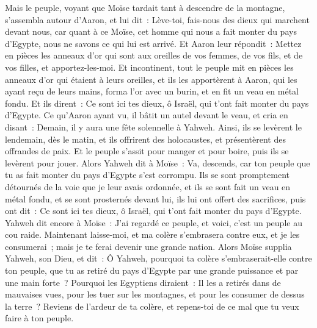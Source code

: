 \begin{multicols}{2}
\VerseOne{}Mais le peuple, voyant que Moïse tardait tant à descendre de la montagne, s'assembla autour d'Aaron, et lui dit~: Lève-toi, fais-nous des dieux qui marchent devant nous, car quant à ce Moïse, cet homme qui nous a fait monter du pays d'Egypte, nous ne savons ce qui lui est arrivé.
Et Aaron leur répondit~: Mettez en pièces les anneaux d'or qui sont aux oreilles de vos femmes, de vos fils, et de vos filles, et apportez-les-moi.
 Et incontinent, tout le peuple mit en pièces les anneaux d'or qui étaient à leurs oreilles, et ils les apportèrent à Aaron, 
qui les ayant reçu de leurs mains, forma l'or avec un burin, et en fit un veau en métal fondu. Et ils dirent~: Ce sont ici tes dieux, ô Israël, qui t'ont fait monter du pays d'Egypte.
Ce qu'Aaron ayant vu, il bâtit un autel devant le veau, et cria en disant~: Demain, il y aura une fête solennelle à Yahweh.
Ainsi, ils se levèrent le lendemain, dès le matin, et ils offrirent des holocaustes, et présentèrent des offrandes de paix. Et le peuple s'assit pour manger et pour boire, puis ils se levèrent pour jouer.
Alors Yahweh dit à Moïse~: Va, descends, car ton peuple que tu as fait monter du pays d'Egypte s'est corrompu.
Ils se sont promptement détournés de la voie que je leur avais ordonnée, et ils se sont fait un veau en métal fondu, et se sont prosternés devant lui, ils lui ont offert des sacrifices, puis ont dit~: Ce sont ici tes dieux, ô Israël, qui t'ont fait monter du pays d'Egypte.
Yahweh dit encore à Moïse~: J'ai regardé ce peuple, et voici, c'est un peuple au cou raide.
Maintenant laisse-moi, et ma colère s'embrasera contre eux, et je les consumerai~; mais je te ferai devenir une grande nation.
Alors Moïse supplia Yahweh, son Dieu, et dit~: Ô Yahweh, pourquoi ta colère s'embraserait-elle contre ton peuple, que tu as retiré du pays d'Egypte par une grande puissance et par une main forte~?
Pourquoi les Egyptiens diraient~: Il les a retirés dans de mauvaises vues, pour les tuer sur les montagnes, et pour les consumer de dessus la terre~? Reviens de l'ardeur de ta colère, et repens-toi de ce mal que tu veux faire à ton peuple.

\end{multicols}

